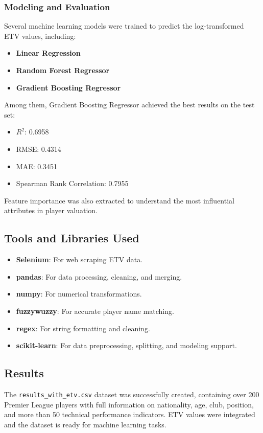 \documentclass[12pt,a4paper]{article}
\begin{document}
\subsubsection{Modeling and Evaluation}
Several machine learning models were trained to predict the log-transformed ETV values, including:
\begin{itemize}
    \item \textbf{Linear Regression}
    \item \textbf{Random Forest Regressor}
    \item \textbf{Gradient Boosting Regressor}
\end{itemize}

Among them, Gradient Boosting Regressor achieved the best results on the test set:
\begin{itemize}
    \item $R^2$: 0.6958
    \item RMSE: 0.4314
    \item MAE: 0.3451
    \item Spearman Rank Correlation: 0.7955
\end{itemize}

Feature importance was also extracted to understand the most influential attributes in player valuation.


\subsection{Tools and Libraries Used}
\begin{itemize}
    \item \textbf{Selenium}: For web scraping ETV data.
    \item \textbf{pandas}: For data processing, cleaning, and merging.
    \item \textbf{numpy}: For numerical transformations.
    \item \textbf{fuzzywuzzy}: For accurate player name matching.
    \item \textbf{regex}: For string formatting and cleaning.
    \item \textbf{scikit-learn}: For data preprocessing, splitting, and modeling support.
\end{itemize}

\subsection{Results}
The \texttt{results\_with\_etv.csv} dataset was successfully created, containing over 200 Premier League players with full information on nationality, age, club, position, and more than 50 technical performance indicators. ETV values were integrated and the dataset is ready for machine learning tasks.
\end{document}
